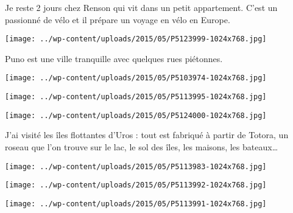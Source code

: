  \newline
 Je reste 2 jours chez Renson qui vit dans un petit appartement. C'est un passionné de vélo et il prépare un voyage en vélo en Europe. \newline
 \newline
\centerline{\texttt{[image: ../wp-content/uploads/2015/05/P5123999-1024x768.jpg]} } 
 \newline
 Puno est une ville tranquille avec quelques rues piétonnes. \newline
 \newline
\centerline{\texttt{[image: ../wp-content/uploads/2015/05/P5103974-1024x768.jpg]} } 
 \newline
 \newline
\centerline{\texttt{[image: ../wp-content/uploads/2015/05/P5113995-1024x768.jpg]} } 
 \newline
 \newline
\centerline{\texttt{[image: ../wp-content/uploads/2015/05/P5124000-1024x768.jpg]} } 
 \newline
 J'ai visité les îles flottantes d'Uros : tout est fabriqué à partir de Totora, un roseau que l'on trouve sur le lac, le sol des îles, les maisons, les bateaux… \newline
 \newline
\centerline{\texttt{[image: ../wp-content/uploads/2015/05/P5113983-1024x768.jpg]} } 
 \newline
 \newline
\centerline{\texttt{[image: ../wp-content/uploads/2015/05/P5113992-1024x768.jpg]} } 
 \newline
 \newline
\centerline{\texttt{[image: ../wp-content/uploads/2015/05/P5113991-1024x768.jpg]} } 
 \newline

\newpage
 
